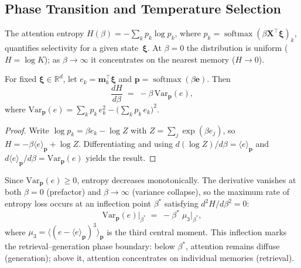 \subsection{Phase Transition and Temperature Selection}\label{sec:phase-transition}

The attention entropy $H(\beta) = -\sum_k p_k \log p_k$, where $p_k = \operatorname{softmax}(\beta\mathbf{X}^{\top}\boldsymbol{\xi})_k$, quantifies selectivity for a given state~$\boldsymbol{\xi}$. At $\beta=0$ the distribution is uniform ($H=\log K$); as $\beta\to\infty$ it concentrates on the nearest memory ($H\to 0$).

\begin{proposition}\label{prop:entropy-derivative}
For fixed $\boldsymbol{\xi}\in\mathbb{R}^d$, let $e_k = \mathbf{m}_k^{\top}\boldsymbol{\xi}$ and $\mathbf{p}=\operatorname{softmax}(\beta\mathbf{e})$. Then
\begin{equation}\label{eq:entropy-deriv}
\frac{dH}{d\beta} \;=\; -\beta\,\mathrm{Var}_{\mathbf{p}}(e),
\end{equation}
where $\mathrm{Var}_{\mathbf{p}}(e) = \sum_k p_k\,e_k^2 - \bigl(\sum_k p_k\,e_k\bigr)^{\!2}$.
\end{proposition}

\begin{proof}
Write $\log p_k = \beta e_k - \log Z$ with $Z=\sum_j\exp(\beta e_j)$, so $H = -\beta\langle e\rangle_{\mathbf{p}} + \log Z$. Differentiating and using $d(\log Z)/d\beta = \langle e\rangle_{\mathbf{p}}$ and $d\langle e\rangle_{\mathbf{p}}/d\beta = \mathrm{Var}_{\mathbf{p}}(e)$ yields the result.
\end{proof}

Since $\mathrm{Var}_{\mathbf{p}}(e)\ge 0$, entropy decreases monotonically. The derivative vanishes at both $\beta=0$ (prefactor) and $\beta\to\infty$ (variance collapse), so the maximum rate of entropy loss occurs at an inflection point $\beta^{*}$ satisfying $d^{2}H/d\beta^{2}=0$:
\begin{equation}\label{eq:inflection}
\mathrm{Var}_{\mathbf{p}}(e)\big|_{\beta^{*}} \;=\; -\beta^{*}\;\mu_{3}\big|_{\beta^{*}},
\end{equation}
where $\mu_3 = \langle(e - \langle e\rangle_{\mathbf{p}})^3\rangle_{\mathbf{p}}$ is the third central moment. This inflection marks the retrieval--generation phase boundary: below $\beta^{*}$, attention remains diffuse (generation); above it, attention concentrates on individual memories (retrieval).

